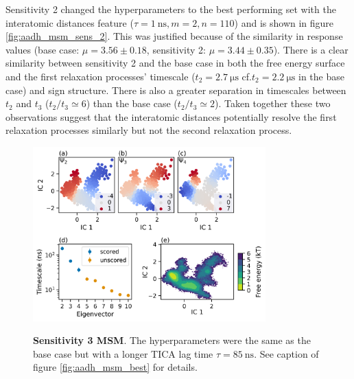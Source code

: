 Sensitivity 2 changed the hyperparameters to the best performing set with the interatomic distances feature ($\tau = \SI{1}{\nano\second}, m=2, n=110$) and is shown in figure \ref{fig:aadh_msm_sens_2}.  This was justified because of the similarity in response values (base case: $\mu=3.56 \pm 0.18$, sensitivity 2: $\mu=3.44 \pm 0.35$). There is a clear similarity between sensitivity 2 and the base case in both the free energy surface and the first relaxation processes' timescale ($t_{2} = \SI{2.7}{\micro\second}$ cf.$t_{2} = \SI{2.2}{\micro\second}$ in the base case) and sign structure.  There is also a greater separation in timescales between $t_{2}$ and $t_{3}$ ($t_{2}/t_{3} \simeq 6$) than the base case ($t_{2}/t_{3} \simeq 2$). Taken together these two observations suggest that the interatomic distances potentially resolve the first relaxation processes similarly but not the second relaxation process. 
\begin{figure}
    \centering
    \caption{\textbf{Sensitivity 3 MSM}. The hyperparameters were the same as the base case but with a  longer TICA lag time $\tau = \SI{85}{\nano\second}$.  See caption of figure \ref{fig:aadh_msm_best} for details.}
    \includegraphics[width=0.8\textwidth]{chapters/msm_optimization/figures/aadh_msm_sens_3.png}
    \label{fig:aadh_msm_sens_3}
\end{figure}

